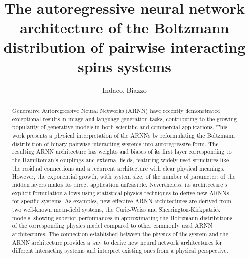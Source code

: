 \documentclass[aps,physrev,10pt,floatfix,reprint]{revtex4-2}
\begin{document}
\title{The autoregressive neural network architecture of the Boltzmann distribution of pairwise interacting spins systems}
\author{Indaco, Biazzo}

\begin{abstract}
    Generative Autoregressive Neural Networks (ARNN) have recently demonstrated exceptional results in image and language generation tasks, contributing to the growing popularity of generative models in both scientific and commercial applications. This work presents a physical interpretation of the ARNNs by reformulating the Boltzmann distribution of binary pairwise interacting systems into autoregressive form. The resulting ARNN architecture has weights and biases of its first layer corresponding to the Hamiltonian's couplings and external fields, featuring widely used structures like the residual connections and a recurrent architecture with clear physical meanings. However, the exponential growth, with system size, of the number of parameters of the hidden layers makes its direct application unfeasible. Nevertheless, its architecture's explicit formulation allows using statistical physics techniques to derive new ARNNs for specific systems. As examples, new effective ARNN architectures are derived from two well-known mean-field systems, the Curie-Weiss and Sherrington-Kirkpatrick models, showing superior performances in approximating the Boltzmann distributions of the corresponding physics model compared to other commonly used ARNN architectures. The connection established between the physics of the system and the ARNN architecture provides a way to derive new neural network architectures for different interacting systems and interpret existing ones from a physical perspective.
\end{abstract}
    
    
\maketitle
\end{document}
